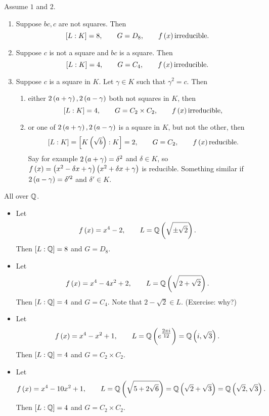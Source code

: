 \begin{theorem}
Assume $ 1 $ and $ 2 $.
\begin{enumerate}
\item Suppose $ bc, c $ are not squares. Then
$$ \left[ L : K \right] = 8, \qquad G = D_8, \qquad f\left( x \right) \text{irreducible}. $$
\item Suppose $ c $ is not a square and $ bc $ is a square. Then
$$ \left[ L : K \right] = 4, \qquad G = C_4, \qquad f\left( x \right) \text{irreducible}. $$
\item Suppose $ c $ is a square in $ K $. Let $ \gamma \in K $ such that $ \gamma^2 = c $. Then
\begin{enumerate}
\item either $ 2\left( a + \gamma \right), 2\left( a - \gamma \right) $ both not squares in $ K $, then
$$ \left[ L : K \right] = 4, \qquad G = C_2 \times C_2, \qquad f\left( x \right) \text{irreducible}, $$
\item or one of $ 2\left( a + \gamma \right), 2\left( a - \gamma \right) $ is a square in $ K $, but not the other, then
$$ \left[ L : K \right] = \left[ K\left( \sqrt{b} \right) : K \right] = 2, \qquad G = C_2, \qquad f\left( x \right) \text{reducible}. $$
Say for example $ 2\left( a + \gamma \right) = \delta^2 $ and $ \delta \in K $, so $ f\left( x \right) = \left( x^2 - \delta x + \gamma \right)\left( x^2 + \delta x + \gamma \right) $ is reducible. Something similar if $ 2\left( a - \gamma \right) = \delta'^2 $ and $ \delta' \in K $.
\end{enumerate}
\end{enumerate}
\end{theorem}

\begin{example*}
All over $ \mathbb{Q} $.
\begin{itemize}
\item Let
$$ f\left( x \right) = x^4 - 2, \qquad L = \mathbb{Q}\left( \sqrt{\pm\sqrt{2}} \right). $$
Then $ \left[ L : \mathbb{Q} \right] = 8 $ and $ G = D_8 $.
\item Let
$$ f\left( x \right) = x^4 - 4x^2 + 2, \qquad L = \mathbb{Q}\left( \sqrt{2 + \sqrt{2}} \right). $$
Then $ \left[ L : \mathbb{Q} \right] = 4 $ and $ G = C_4 $. Note that $ 2 - \sqrt{2} \in L $. (Exercise: why?)
\item Let
$$ f\left( x \right) = x^4 - x^2 + 1, \qquad L = \mathbb{Q}\left( e^{\tfrac{2\pi i}{12}} \right) = \mathbb{Q}\left( i, \sqrt{3} \right). $$
Then $ \left[ L : \mathbb{Q} \right] = 4 $ and $ G = C_2 \times C_2 $.
\item Let
$$ f\left( x \right) = x^4 - 10x^2 + 1, \qquad L = \mathbb{Q}\left( \sqrt{5 + 2\sqrt{6}} \right) = \mathbb{Q}\left( \sqrt{2} + \sqrt{3} \right) = \mathbb{Q}\left( \sqrt{2}, \sqrt{3} \right). $$
Then $ \left[ L : \mathbb{Q} \right] = 4 $ and $ G = C_2 \times C_2 $.
\end{itemize}
\end{example*}

